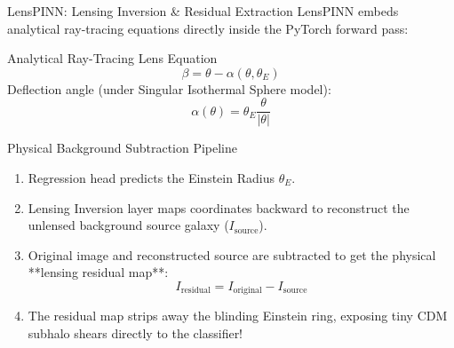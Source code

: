 \documentclass[10pt]{beamer}
\begin{document}
\begin{frame}{LensPINN: Lensing Inversion \& Residual Extraction}
    LensPINN embeds analytical ray-tracing equations directly inside the PyTorch forward pass:
    \vspace{0.2cm}
    \begin{block}{Analytical Ray-Tracing Lens Equation}
        $$\beta = \theta - \alpha(\theta, \theta_E)$$
        Deflection angle (under Singular Isothermal Sphere model):
        $$\alpha(\theta) = \theta_E \frac{\theta}{|\theta|}$$
    \end{block}
    \begin{block}{Physical Background Subtraction Pipeline}
        \begin{enumerate}
            \item Regression head predicts the Einstein Radius $\theta_E$.
            \item Lensing Inversion layer maps coordinates backward to reconstruct the unlensed background source galaxy ($I_{\text{source}}$).
            \item Original image and reconstructed source are subtracted to get the physical **lensing residual map**:
            $$I_{\text{residual}} = I_{\text{original}} - I_{\text{source}}$$
            \item The residual map strips away the blinding Einstein ring, exposing tiny CDM subhalo shears directly to the classifier!
        \end{enumerate}
    \end{block}
\end{frame}
\end{document}
